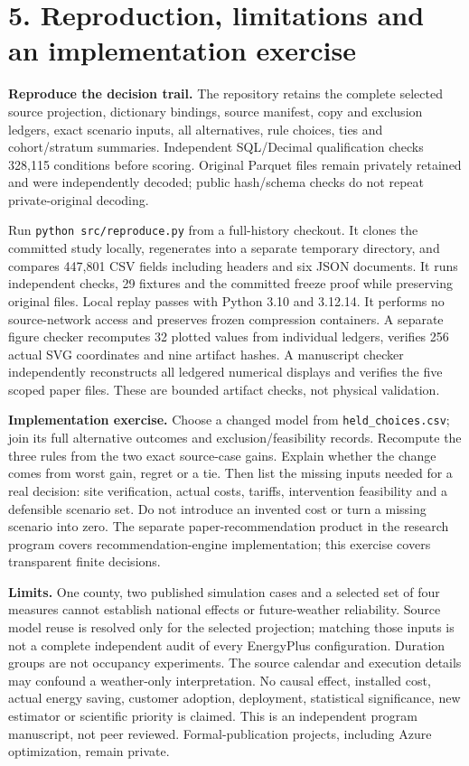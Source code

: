 \documentclass[10pt,letterpaper]{article}
\begin{document}
\section*{5. Reproduction, limitations and an implementation exercise}
\textbf{Reproduce the decision trail.} The repository retains the complete selected source projection, dictionary bindings, source manifest, copy and exclusion ledgers, exact scenario inputs, all alternatives, rule choices, ties and cohort/stratum summaries. Independent SQL/Decimal qualification checks 328,115 conditions before scoring. Original Parquet files remain privately retained and were independently decoded; public hash/schema checks do not repeat private-original decoding.

Run \texttt{python src/reproduce.py} from a full-history checkout. It clones the committed study locally, regenerates into a separate temporary directory, and compares 447,801 CSV fields including headers and six JSON documents. It runs independent checks, 29 fixtures and the committed freeze proof while preserving original files. Local replay passes with Python 3.10 and 3.12.14. It performs no source-network access and preserves frozen compression containers. A separate figure checker recomputes 32 plotted values from individual ledgers, verifies 256 actual SVG coordinates and nine artifact hashes. A manuscript checker independently reconstructs all ledgered numerical displays and verifies the five scoped paper files. These are bounded artifact checks, not physical validation.

\textbf{Implementation exercise.} Choose a changed model from \texttt{held\_choices.csv}; join its full alternative outcomes and exclusion/feasibility records. Recompute the three rules from the two exact source-case gains. Explain whether the change comes from worst gain, regret or a tie. Then list the missing inputs needed for a real decision: site verification, actual costs, tariffs, intervention feasibility and a defensible scenario set. Do not introduce an invented cost or turn a missing scenario into zero. The separate paper-recommendation product in the research program covers recommendation-engine implementation; this exercise covers transparent finite decisions.

\textbf{Limits.} One county, two published simulation cases and a selected set of four measures cannot establish national effects or future-weather reliability. Source model reuse is resolved only for the selected projection; matching those inputs is not a complete independent audit of every EnergyPlus configuration. Duration groups are not occupancy experiments. The source calendar and execution details may confound a weather-only interpretation. No causal effect, installed cost, actual energy saving, customer adoption, deployment, statistical significance, new estimator or scientific priority is claimed. This is an independent program manuscript, not peer reviewed. Formal-publication projects, including Azure optimization, remain private.
\end{document}
